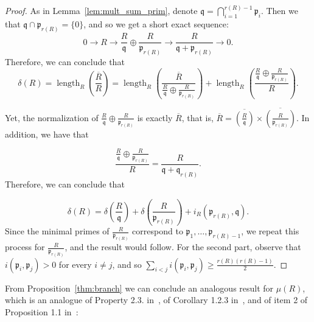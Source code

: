 \documentclass{article}
\DeclareMathOperator{\length}{length}
\numberwithin{theorem}{section}
\begin{document}
\begin{proof}
As in Lemma~\ref{lem:mult_sum_prim}, denote $\mathfrak{q}=\bigcap_{i=1}^{r(R)-1} \mathfrak{p}_i$. Then we that $\mathfrak{q}\cap \mathfrak{p}_{r(R)} = \{0\}$, and so we get a short exact sequence:
\begin{equation*}
    0 \to R \to \frac{R}{\mathfrak{q}} \oplus \frac{R}{\mathfrak{p}_{r(R)}} \to \frac{R}{\mathfrak{q}+\mathfrak{p}_{r(R)}} \to 0. 
\end{equation*}
\noindent Therefore, we can conclude that 
\begin{equation*}
    \delta(R)=\length_R\left(\frac{\overline{R}}{R}\right) = \length_R\left(\frac{\overline{R}}{\frac{R}{\mathfrak{q}} \oplus \frac{R}{\mathfrak{p}_{r(R)}} }\right) + \length_R \left(\frac{\frac{R}{\mathfrak{q}} \oplus \frac{R}{\mathfrak{p}_{r(R)}} }{R} \right).
\end{equation*}

\noindent Yet, the normalization of $\frac{R}{\mathfrak{q}} \oplus \frac{R}{\mathfrak{p}_{r(R)}}$ is exactly $\overline{R}$, that is, $\overline{R} = \overline{\left(\frac{R}{\mathfrak{q}}\right)} \times \overline{\left(\frac{R}{\mathfrak{p}_{r(R)}}\right)}$. In addition, we have that


\begin{equation*}
    \frac{\frac{R}{\mathfrak{q}} \oplus \frac{R}{\mathfrak{p}_{r(R)}} }{R}  = \frac{R}{\mathfrak{q} + \mathfrak{q}_{r(R)}}. 
\end{equation*}
\noindent Therefore, we can conclude that 

\begin{equation*}
    \delta(R) = \delta\left(\frac{R}{\mathfrak{q}}\right) + \delta\left(\frac{R}{\mathfrak{p}_{r(R)}} \right) + i_R(\mathfrak{p}_{r(R)}, \mathfrak{q}).
\end{equation*}
\noindent Since the minimal primes of $\frac{R}{\mathfrak{p}_{r(R)}}$ correspond to $\mathfrak{p}_1, \dots, \mathfrak{p}_{r(R)-1}$, we repeat this process for $\frac{R}{\mathfrak{p}_{r(R)}}$, and the result would follow. For the second part, observe that $i(\mathfrak{p}_i, \mathfrak{p}_j)>0$ for every $i  \neq j$, and so $\sum_{i <  j} i(\mathfrak{p}_i, \mathfrak{p}_j) \geq \frac{r(R)(r(R)-1)}{2}$. 
\end{proof}



From Proposition~\ref{thm:branch} we can conclude an analogous result for $\mu(R)$, which is an analogue of Property 2.3. in~\cite{ploski1995milnor}, of Corollary 1.2.3 in~\cite{buchweitz1980milnor}, and of item 2 of Proposition 1.1 in~\cite{barroso2018milnor}:
\end{document}
